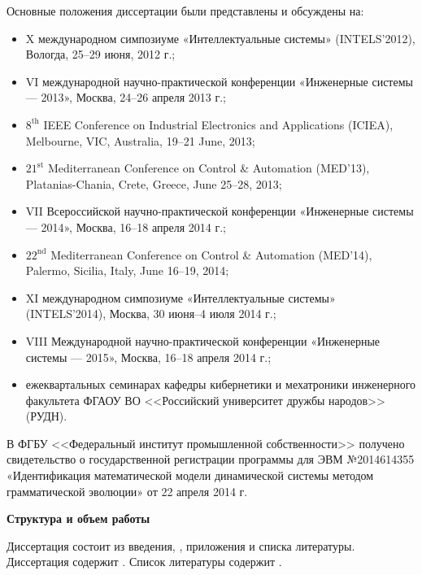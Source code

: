 Основные положения диссертации были представлены и обсуждены на:
\begin{itemize}
    \item X международном симпозиуме «Интеллектуальные системы» (INTELS'2012), Вологда, 25--29 июня, 2012 г.;
    \item VI международной научно-практической конференции «Инженерные системы — 2013», Москва, 24--26 апреля 2013 г.;
    \item $8^{\text{th}}$ IEEE Conference on Industrial Electronics and Applications (ICIEA), Melbourne, VIC, Australia, 19--21 June, 2013;
    \item $21^{\text{st}}$ Mediterranean Conference on Control \& Automation (MED'13), Platanias-Chania, Crete, Greece, June 25--28, 2013;
    \item VII Всероссийской научно-практической конференции «Инженерные системы — 2014», Москва, 16--18 апреля 2014 г.;
    \item $22^{\text{nd}}$ Mediterranean Conference on Control \& Automation (MED'14), Palermo, Sicilia, Italy, June 16--19, 2014;
    \item XI международном симпозиуме «Интеллектуальные системы» (INTELS'2014), Москва, 30 июня--4 июля 2014 г.;
    \item VIII Международной научно-практической конференции «Инженерные системы — 2015», Москва, 16--18 апреля 2014 г.;
    \item ежеквартальных семинарах кафедры кибернетики и мехатроники инженерного факультета ФГАОУ ВО <<Российский университет дружбы народов>> (РУДН).
\end{itemize}

В ФГБУ <<Федеральный институт промышленной собственности>> получено свидетельство о государственной регистрации программы для ЭВМ №2014614355 «Идентификация математической модели динамической системы методом грамматической эволюции» от 22 апреля 2014 г.

\textbf{Структура и объем работы}

Диссертация состоит из введения, , приложения и списка литературы. Диссертация содержит . Список литературы содержит .

\clearpage